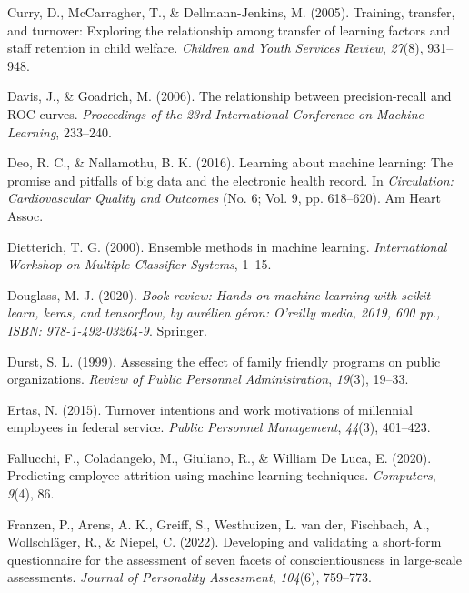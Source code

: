 \documentclass[
  man]{apa7}
\newlength{\cslhangindent}
\newlength{\cslentryspacingunit} %
\newenvironment{CSLReferences}[2] %
 {%
  \setlength{\parindent}{0pt}
  \ifodd #1
  \let\oldpar\par
  \def\par{\hangindent=\cslhangindent\oldpar}
  \fi
  \setlength{\parskip}{#2\cslentryspacingunit}
 }%
 {}
\begin{document}
\begin{CSLReferences}{1}{0}
\leavevmode{}%
Curry, D., McCarragher, T., \& Dellmann-Jenkins, M. (2005). Training, transfer, and turnover: Exploring the relationship among transfer of learning factors and staff retention in child welfare. \emph{Children and Youth Services Review}, \emph{27}(8), 931--948.

\leavevmode{}%
Davis, J., \& Goadrich, M. (2006). The relationship between precision-recall and ROC curves. \emph{Proceedings of the 23rd International Conference on Machine Learning}, 233--240.

\leavevmode{}%
Deo, R. C., \& Nallamothu, B. K. (2016). Learning about machine learning: The promise and pitfalls of big data and the electronic health record. In \emph{Circulation: Cardiovascular Quality and Outcomes} (No. 6; Vol. 9, pp. 618--620). Am Heart Assoc.

\leavevmode{}%
Dietterich, T. G. (2000). Ensemble methods in machine learning. \emph{International Workshop on Multiple Classifier Systems}, 1--15.

\leavevmode{}%
Douglass, M. J. (2020). \emph{Book review: Hands-on machine learning with scikit-learn, keras, and tensorflow, by aur{é}lien g{é}ron: O'reilly media, 2019, 600 pp., ISBN: 978-1-492-03264-9}. Springer.

\leavevmode{}%
Durst, S. L. (1999). Assessing the effect of family friendly programs on public organizations. \emph{Review of Public Personnel Administration}, \emph{19}(3), 19--33.

\leavevmode{}%
Ertas, N. (2015). Turnover intentions and work motivations of millennial employees in federal service. \emph{Public Personnel Management}, \emph{44}(3), 401--423.

\leavevmode{}%
Fallucchi, F., Coladangelo, M., Giuliano, R., \& William De Luca, E. (2020). Predicting employee attrition using machine learning techniques. \emph{Computers}, \emph{9}(4), 86.

\leavevmode{}%
Franzen, P., Arens, A. K., Greiff, S., Westhuizen, L. van der, Fischbach, A., Wollschläger, R., \& Niepel, C. (2022). Developing and validating a short-form questionnaire for the assessment of seven facets of conscientiousness in large-scale assessments. \emph{Journal of Personality Assessment}, \emph{104}(6), 759--773.


\end{CSLReferences}
\end{document}
